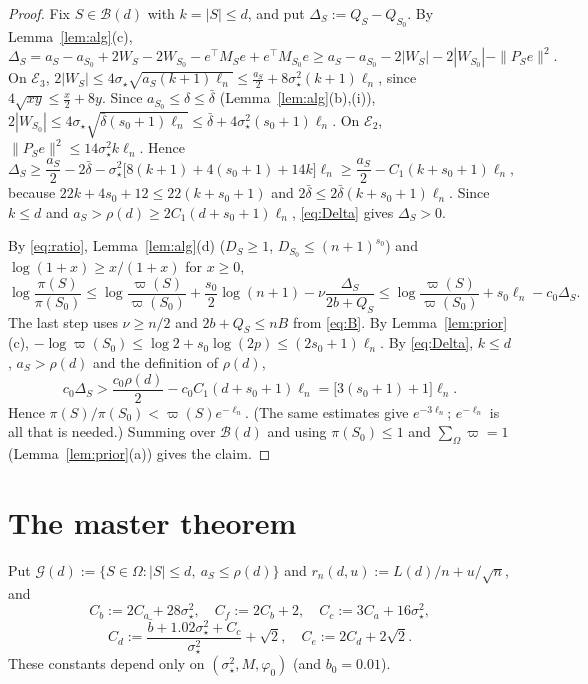 \documentclass[11pt]{article}
\theoremstyle{remark}
\newcommand{\vp}{\varpi}
\newcommand{\sst}{\sigma_\star}
\begin{document}
\begin{proof}
Fix $S\in\mathcal B(d)$ with $k=|S|\le d$, and put $\Delta_S:=Q_S-Q_{S_0}$. By Lemma~\ref{lem:alg}(c),
\[
\Delta_S=a_S-a_{S_0}+2W_S-2W_{S_0}-e^\top M_Se+e^\top M_{S_0}e\ge a_S-a_{S_0}-2|W_S|-2|W_{S_0}|-\|P_Se\|^2 .
\]
On $\mathcal E_3$, $2|W_S|\le4\sst\sqrt{a_S(k+1)\ell_n}\le\frac{a_S}2+8\sst^2(k+1)\ell_n$, since $4\sqrt{xy}\le\frac x2+8y$. Since $a_{S_0}\le\delta\le\bar\delta$ (Lemma~\ref{lem:alg}(b),(i)), $2|W_{S_0}|\le4\sst\sqrt{\bar\delta(s_0+1)\ell_n}\le\bar\delta+4\sst^2(s_0+1)\ell_n$. On $\mathcal E_2$, $\|P_Se\|^2\le14\sst^2k\ell_n$. Hence
\begin{equation}\label{eq:Delta}
\Delta_S\ge\frac{a_S}2-2\bar\delta-\sst^2\big[8(k+1)+4(s_0+1)+14k\big]\ell_n\ge\frac{a_S}2-C_1(k+s_0+1)\ell_n,
\end{equation}
because $22k+4s_0+12\le22(k+s_0+1)$ and $2\bar\delta\le2\bar\delta(k+s_0+1)\ell_n$. Since $k\le d$ and $a_S>\rho(d)\ge2C_1(d+s_0+1)\ell_n$, \eqref{eq:Delta} gives $\Delta_S>0$.

By \eqref{eq:ratio}, Lemma~\ref{lem:alg}(d) ($D_S\ge1$, $D_{S_0}\le(n+1)^{s_0}$) and $\log(1+x)\ge x/(1+x)$ for $x\ge0$,
\[
\log\frac{\pi(S)}{\pi(S_0)}\le\log\frac{\vp(S)}{\vp(S_0)}+\frac{s_0}2\log(n+1)-\nu\frac{\Delta_S}{2b+Q_S}\le\log\frac{\vp(S)}{\vp(S_0)}+s_0\ell_n-c_0\Delta_S .
\]
The last step uses $\nu\ge n/2$ and $2b+Q_S\le nB$ from \eqref{eq:B}. By Lemma~\ref{lem:prior}(c), $-\log\vp(S_0)\le\log2+s_0\log(2p)\le(2s_0+1)\ell_n$. By \eqref{eq:Delta}, $k\le d$, $a_S>\rho(d)$ and the definition of $\rho(d)$,
\[
c_0\Delta_S>\frac{c_0\rho(d)}2-c_0C_1(d+s_0+1)\ell_n=\big[3(s_0+1)+1\big]\ell_n .
\]
Hence $\pi(S)/\pi(S_0)<\vp(S)e^{-\ell_n}$. (The same estimates give $e^{-3\ell_n}$; $e^{-\ell_n}$ is all that is needed.) Summing over $\mathcal B(d)$ and using $\pi(S_0)\le1$ and $\sum_\Omega\vp=1$ (Lemma~\ref{lem:prior}(a)) gives the claim.
\end{proof}

\section{The master theorem}\label{sec:master}

Put $\mathcal G(d):=\{S\in\Omega:|S|\le d,\ a_S\le\rho(d)\}$ and $r_n(d,u):=L(d)/n+u/\sqrt n$, and
\[
C_b:=2C_a+28\sst^2,\quad C_f:=2C_b+2,\quad C_c:=3C_a+16\sst^2,\]
\[C_d:=\frac{\bar b+1.02\sst^2+C_c}{\sst^2}+\sqrt2,\quad C_e:=2C_d+2\sqrt2 .
\]
These constants depend only on $(\sst^2,M,\varphi_0)$ (and $b_0=0.01$).
\end{document}
